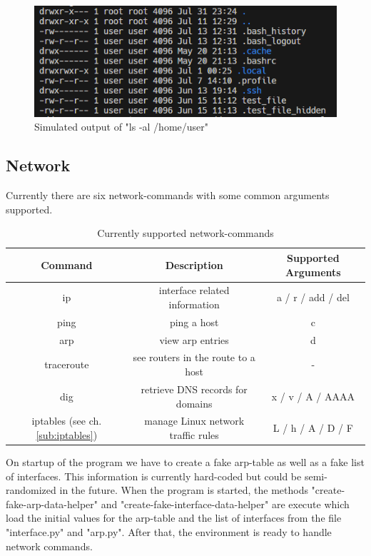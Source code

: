 \begin{figure}[H]
    \centering
    \includegraphics[width=1\linewidth]{bilder/ls.png}
    \caption{Simulated output of "ls -al /home/user"}
\end{figure}

\subsection{Network}
Currently there are six network-commands with some common arguments supported.

\begin{table}[H]
    \centering
    \begin{tabular}{c|c|c}
        Command & Description & Supported Arguments\\
        \hline 
        ip & interface related information & a / r / add / del\\
        ping & ping a host & c \\
        arp & view arp entries & d\\
        traceroute & see routers in the route to a host & - \\
        dig & retrieve DNS records for domains & x / v / A / AAAA\\
        iptables (see ch. \ref{sub:iptables}) & manage Linux network traffic rules & L / h / A / D / F\\
    \end{tabular}
    \caption{Currently supported network-commands}
    \label{tab:my_label}
\end{table}

On startup of the program we have to create a fake arp-table as well as a fake list of interfaces. This information is currently hard-coded but could be semi-randomized in the future. When the program is started, the methods "create-fake-arp-data-helper" and "create-fake-interface-data-helper" are execute which load the initial values for the arp-table and the list of interfaces from the file "interface.py" and "arp.py". After that, the environment is ready to handle network commands.

